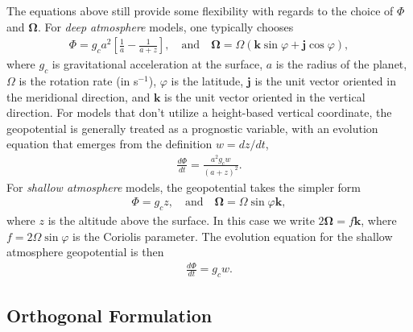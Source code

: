 \documentclass[gmd, manuscript]{copernicus}
\newcommand{\vb}{\mathbf}
\newcommand{\vg}{\boldsymbol}
\newcommand{\diff}[2]{\frac{d #1}{d #2}}
\begin{document}

The equations above still provide some flexibility with regards to the choice of $\Phi$ and $\vg{\Omega}$.  For \textit{deep atmosphere} models, one typically chooses
\begin{align} \label{eq:DeepAtmosphereGeopotential}
\Phi = g_c a^2 \left[\frac{1}{a} - \frac{1}{a+z}\right], \quad \mbox{and} \quad \vg{\Omega} = \Omega ( \vb{k} \sin \varphi + \vb{j} \cos \varphi),
\end{align} where $g_c$ is gravitational acceleration at the surface, $a$ is the radius of the planet, $\Omega$ is the rotation rate (in s$^{-1}$), $\varphi$ is the latitude, $\vb{j}$ is the unit vector oriented in the meridional direction, and $\vb{k}$ is the unit vector oriented in the vertical direction.  For models that don't utilize a height-based vertical coordinate, the geopotential is generally treated as a prognostic variable, with an evolution equation that emerges from the definition $w = dz/dt$,
\begin{align}
\diff{\Phi}{t} = \frac{a^2 g_c w}{(a + z)^2}.
\end{align}  For \textit{shallow atmosphere} models, the geopotential takes the simpler form
\begin{align} \label{eq:ShallowAtmosphereGeopotential}
\Phi = g_c z, \quad \mbox{and} \quad \vg{\Omega} = \Omega \sin \varphi \vb{k},
\end{align} where $z$ is the altitude above the surface.  In this case we write $2 \vg{\Omega} = f \vb{k}$, where $f = 2 \Omega \sin \varphi$ is the Coriolis parameter.  The evolution equation for the shallow atmosphere geopotential is then
\begin{align} \label{eq:PrognosticShallowGeopotential}
\diff{\Phi}{t} = g_c w.
\end{align}

\subsection{Orthogonal Formulation}
\end{document}
